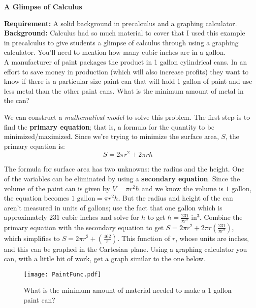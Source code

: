 \documentclass[12pt]{article}
\begin{document}
\begin{center}
{\Large \textbf{A Glimpse of Calculus}}\\
\end{center}
\textbf{Requirement:} A solid background in precalculus and a 
graphing calculator.\\
\textbf{Background:} Calculus had so much material to cover that
I used this example in precalculus to give students a glimpse of
calculus through using a graphing calculator. You'll need to mention
how many cubic inches are in a gallon.\\

A manufacturer of paint packages the product in 1 gallon cylindrical 
cans. In an effort to save money in production (which will also 
increase profits) they want to know if there is a particular size paint 
can that will hold $1$ gallon of paint and use less metal than the 
other paint cans. What is the minimum amount of metal in the can?

We can construct a \textit{mathematical model} to solve this 
problem. The first step is to find the {\bf primary equation}; that is, 
a formula for the quantity to be minimized/maximized. Since we're 
trying to minimize the surface area, $S$, the primary equation is:
\[S=2\pi r^2+2\pi rh \]

The formula for surface area has two unknowns: the radius and the 
height. One of the variables can be eliminated by using a 
{\bf secondary equation}. Since the volume of the paint can is 
given by $V=\pi r^2h$ and we know the volume is $1$ gallon, the
equation becomes $1 \mbox{ gallon}=\pi r^2h$. But the radius
and height of the can aren't measured in units of gallons; use the 
fact that one gallon which is approximately $231$ cubic inches and 
solve for $h$ to get $h=\frac{231}{\pi r^2}\mbox{ in}^3$. 
Combine the primary equation with the secondary equation 
to get $S=2\pi r^2+2\pi r\left(\frac{231}{\pi r^2}\right)$, 
which simplifies to $S=2\pi r^2+\left(\frac{462}{r}\right)$. 
This function of $r$, whose units are inches, and this can be 
graphed in the 
Cartesian plane. Using a graphing calculator you can, with a little 
bit of work, get a graph similar to the one below.

\begin{figure}[h]
\begin{center}	
  \texttt{[image: PaintFunc.pdf]}
  \end{center}
\caption{What is the minimum amount of material needed to make a 1 gallon paint can?} \label{fg:ptcn}
\end{figure}
\end{document}

